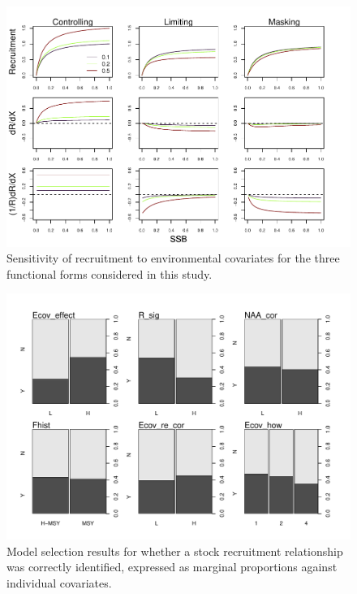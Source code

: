 \documentclass[11pt]{article}
\begin{document}
\begin{figure}[htb]
\begin{center}
\includegraphics[width = 6in]{dRdX_1RdRdx.pdf}
\caption{Sensitivity of recruitment to environmental covariates for the three functional forms considered in this study.}
\end{center}
\end{figure}


\begin{figure}[htb]
\begin{center}
\includegraphics[width = 5in]{raw_boxplots_SR.pdf}
\caption{Model selection results for whether a stock recruitment relationship was correctly identified, expressed as marginal proportions against individual covariates.}
\end{center}
\end{figure}
\end{document}

